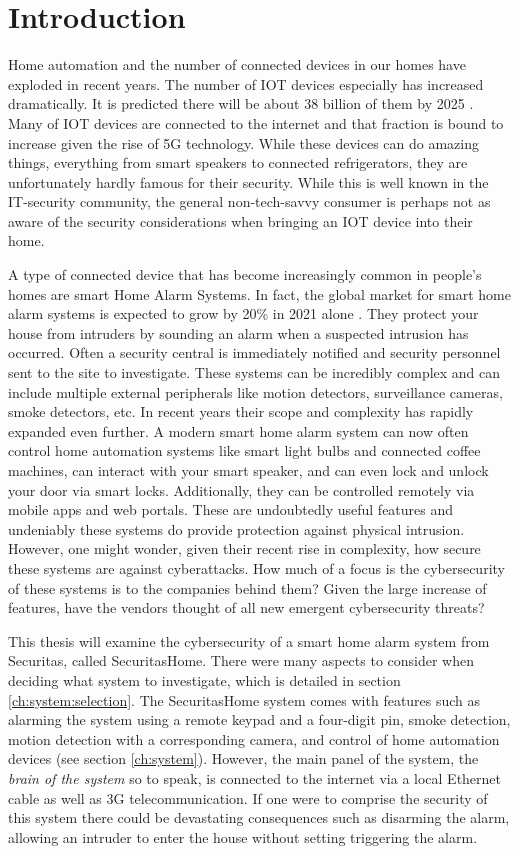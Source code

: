 \chapter{Introduction} \label{ch:intro}
Home automation and the number of connected devices in our homes have exploded in recent years. The number of \gls{IOT} devices especially has increased dramatically. It is predicted there will be about 38 billion of them by 2025 \cite{ieee-iot}. Many of \gls{IOT} devices are connected to the internet and that fraction is bound to increase given the rise of 5G technology. While these devices can do amazing things, everything from smart speakers to connected refrigerators, they are unfortunately hardly famous for their security. While this is well known in the IT-security community, the general non-tech-savvy consumer is perhaps not as aware of the security considerations when bringing an \gls{IOT} device into their home.

A type of connected device that has become increasingly common in people's homes are smart Home Alarm Systems. In fact, the global market for smart home alarm systems is expected to grow by 20\% in 2021 alone \cite{alarmsystem-market-analysis}. They protect your house from intruders by sounding an alarm when a suspected intrusion has occurred. Often a security central is immediately notified and security personnel sent to the site to investigate. These systems can be incredibly complex and can include multiple external peripherals like motion detectors, surveillance cameras, smoke detectors, etc. In recent years their scope and complexity has rapidly expanded even further. A modern smart home alarm system can now often control home automation systems like smart light bulbs and connected coffee machines, can interact with your smart speaker, and can even lock and unlock your door via smart locks. Additionally, they can be controlled remotely via mobile apps and web portals. These are undoubtedly useful features and undeniably these systems do provide protection against physical intrusion. However, one might wonder, given their recent rise in complexity, how secure these systems are against cyberattacks. How much of a focus is the cybersecurity of these systems is to the companies behind them? Given the large increase of features, have the vendors thought of all new emergent cybersecurity threats?

This thesis will examine the cybersecurity of a smart home alarm system from Securitas, called SecuritasHome. There were many aspects to consider when deciding what system to investigate, which is detailed in section \ref{ch:system:selection}. The SecuritasHome system comes with features such as alarming the system using a remote keypad and a four-digit pin, smoke detection, motion detection with a corresponding camera, and control of home automation devices (see section \ref{ch:system}). However, the main panel of the system, the \textit{brain of the system} so to speak, is connected to the internet via a local Ethernet cable as well as 3G telecommunication. If one were to comprise the security of this system there could be devastating consequences such as disarming the alarm, allowing an intruder to enter the house without setting triggering the alarm.


